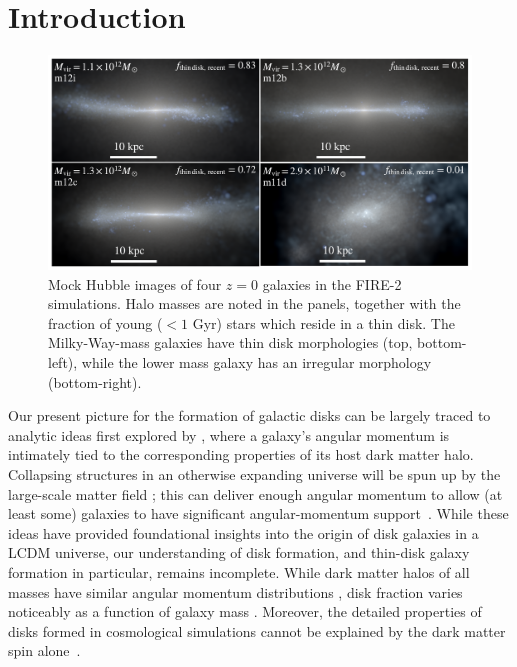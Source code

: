 \documentclass[fleqn,usenatbib]{mnras}
\begin{document}
\section{Introduction}
\label{s: introduction}

\begin{figure}
    \centering
    \includegraphics[width=\textwidth]{figures/stars.pdf}
    \caption{
    Mock Hubble images of four $z=0$ galaxies in the FIRE-2 simulations. Halo masses are noted in the panels, together with the fraction of young ($<1$ Gyr) stars which reside in a thin disk.  The Milky-Way-mass galaxies have thin disk morphologies (top, bottom-left), while the lower mass galaxy has an irregular morphology (bottom-right).
    }
    \label{f: stars}
\end{figure}

Our present picture for the formation of galactic disks can be largely traced to analytic ideas first explored by \citet{fall1980}, where a galaxy's angular momentum is intimately tied to the corresponding properties of its host dark matter halo.
Collapsing structures in an otherwise expanding universe will be spun up by the large-scale matter field \citep{Peebles69};
this can deliver enough angular momentum to allow (at least some) galaxies to have significant angular-momentum support~\citep[e.g.][]{MMW98}. 
While these ideas have provided foundational insights into the origin of disk galaxies in a LCDM universe, our understanding of disk  formation, and thin-disk galaxy formation in particular, remains incomplete. 
While dark matter halos of all masses have similar angular momentum distributions \citep[e.g.][]{Barnes87}, disk fraction varies noticeably as a function of galaxy mass \citep[e.g.[]{Bernardi2010,Moffett16}.
Moreover, the detailed properties of disks formed in cosmological simulations cannot be explained by the dark matter spin alone~\citep[e.g.][]{Sales2012, GK18}.  
\end{document}
